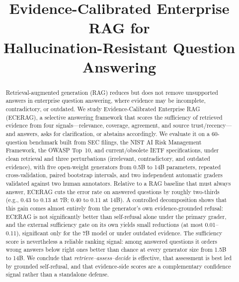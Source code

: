 \documentclass[conference,letterpaper]{IEEEtran}
\begin{document}
\title{Evidence-Calibrated Enterprise RAG for\\Hallucination-Resistant Question Answering}

\author{
\and
{}
}

\maketitle

\begin{abstract}
Retrieval-augmented generation (RAG) reduces but does not remove unsupported answers in
enterprise question answering, where evidence may be incomplete, contradictory, or outdated.
We study Evidence-Calibrated Enterprise RAG (ECERAG), a selective answering framework that scores
the sufficiency of retrieved evidence from four signals---relevance, coverage, agreement, and
source trust/recency---and answers, asks for clarification, or abstains accordingly. We evaluate it
on a 60-question benchmark built from SEC filings, the NIST AI Risk Management Framework, the
OWASP Top~10, and current/obsolete IETF specifications, under clean retrieval and three
perturbations (irrelevant, contradictory, and outdated evidence), with five open-weight generators
from 0.5B to 14B parameters, repeated cross-validation, paired bootstrap intervals, and two
independent automatic graders validated against two human annotators. Relative to a RAG baseline that
must always answer, ECERAG cuts the error rate on answered questions by roughly two-thirds (e.g.,
0.43 to 0.13 at 7B; 0.40 to 0.11 at 14B). A controlled decomposition shows that this gain comes
almost entirely from the generator's own evidence-grounded refusal: ECERAG is not significantly
better than self-refusal alone under the primary grader, and the external sufficiency gate on its
own yields small reductions (at most 0.01--0.11), significant only for the 7B model or under
outdated evidence. The sufficiency score is nevertheless a reliable ranking signal: among answered
questions it orders wrong answers below right ones better than chance at every generator size
from 1.5B to 14B. We conclude that
\emph{retrieve--assess--decide} is effective, that assessment is best led by grounded
self-refusal, and that evidence-side scores are a complementary confidence signal rather than a
standalone defense.
\end{abstract}
\end{document}
